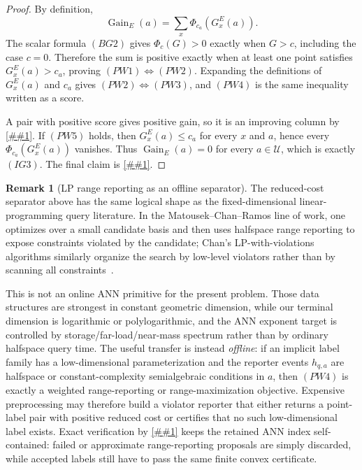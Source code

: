 \documentclass[10pt]{article}
\newcommand{\cref}[1]{\ref{##1}}
\theoremstyle{definition}
\newtheorem{remark}[theorem]{Remark}
\begin{document}
\begin{proof}
   By definition,
   \[
      \operatorname{Gain}_E(a)=\sum_x\Phi_{c_a}(G_x^E(a)).
   \]
   The scalar formula \((BG2)\) gives
   \(\Phi_c(G)>0\) exactly when \(G>c\), including the case \(c=0\).  Therefore
   the sum is positive exactly when at least one point satisfies
   \(G_x^E(a)>c_a\), proving \((PW1)\iff(PW2)\).  Expanding the definitions of
   \(G_x^E(a)\) and \(c_a\) gives \((PW2)\iff(PW3)\), and \((PW4)\) is the same
   inequality written as a score.

   A pair with positive score gives positive gain, so it is an improving column
   by \cref{cor:whole-bucket-reduced-gain}.  If \((PW5)\) holds, then
   \(G_x^E(a)\le c_a\) for every \(x\) and \(a\), hence every
   \(\Phi_{c_a}(G_x^E(a))\) vanishes.  Thus
   \(\operatorname{Gain}_E(a)=0\) for every \(a\in\mathcal U\), which is
   exactly \((IG3)\).  The final claim is
   \cref{lem:implicit-reduced-gain-separation}.
\end{proof}

\begin{remark}[LP range reporting as an offline separator]
   \label{rem:lp-range-reporting-separator}
   The reduced-cost separator above has the same logical shape as the
   fixed-dimensional linear-programming query literature.  In the
   Matousek--Chan--Ramos line of work, one optimizes over a small candidate
   basis and then uses halfspace range reporting to expose constraints violated
   by the candidate; Chan's LP-with-violations algorithms similarly organize
   the search by low-level violators rather than by scanning all
   constraints~\cite{Cha96LP,Ram00LP,Cha04Viol}.

   This is not an online ANN primitive for the present problem.  Those data
   structures are strongest in constant geometric dimension, while our
   terminal dimension is logarithmic or polylogarithmic, and the ANN exponent
   target is controlled by storage/far-load/near-mass spectrum rather than by
   ordinary halfspace query time.  The useful transfer is instead
   \emph{offline}: if an implicit label family has a low-dimensional
   parameterization and the reporter events \(h_{q,a}\) are halfspace or
   constant-complexity semialgebraic conditions in \(a\), then
   \((PW4)\) is exactly a weighted range-reporting or range-maximization
   objective.  Expensive preprocessing may therefore build a violator reporter
   that either returns a point-label pair with positive reduced cost or
   certifies that no such low-dimensional label exists.  Exact verification by
   \cref{cor:pointwise-reduced-cost-separation} keeps the retained ANN index
   self-contained: failed or approximate range-reporting proposals are simply
   discarded, while accepted labels still have to pass the same finite convex
   certificate.
\end{remark}
\end{document}
